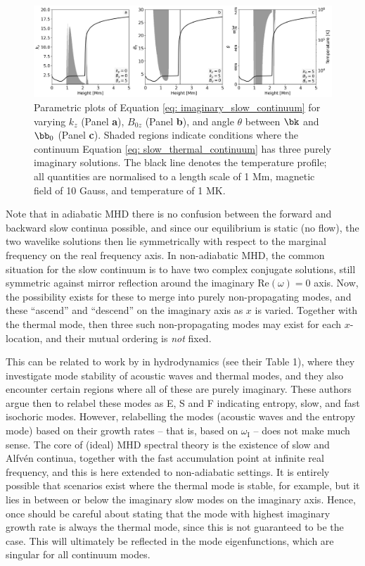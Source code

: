 \begin{figure}[t]
  \centering
  \includegraphics[width=\textwidth]{imaginarysolutions.png}
  \caption{
    Parametric plots of Equation \eqref{eq: imaginary_slow_continuum} for varying $k_z$ (Panel \textbf{a}),
    $B_{0z}$ (Panel \textbf{b}), and angle $\theta$ between $\bk$ and $\bb_0$ (Panel \textbf{c}). Shaded regions indicate conditions where the continuum Equation \eqref{eq: slow_thermal_continuum} has three purely imaginary solutions. The black line denotes the temperature profile; all quantities are normalised to a length scale of 1 Mm, magnetic field of 10 Gauss, and temperature of 1 MK.
  }
  \label{fig: parametric_imaginary}
\end{figure}

Note that in adiabatic MHD there is no confusion between the forward and backward slow continua possible, and since our equilibrium is static (no flow), the two wavelike solutions then lie symmetrically with respect to the marginal frequency on the real frequency axis. In non-adiabatic MHD, the common situation for the slow continuum is to have two complex conjugate solutions, still symmetric against mirror reflection around the imaginary Re$(\omega) = 0$ axis. Now, the possibility exists for these to merge into purely non-propagating modes, and these ``ascend'' and ``descend'' on the imaginary axis as $x$ is varied. Together with the thermal mode, then three such non-propagating modes may exist for each $x$-location, and their mutual ordering is \emph{not} fixed.

This can be related to work by \citet{waters2019} in hydrodynamics (see their Table 1), where they investigate mode stability of acoustic waves and thermal modes, and they also encounter certain regions where all of these are purely imaginary. These authors argue then to relabel these modes as E, S and F indicating entropy, slow, and fast isochoric modes. However, relabelling the modes (acoustic waves and the entropy mode) based on their growth rates -- that is, based on $\omega_\text{I}$ -- does not make much sense. The core of (ideal) MHD spectral theory is the existence of slow and Alfv\'en continua, together with the fast accumulation point at infinite real frequency, and this is here extended to non-adiabatic settings. It is entirely possible that scenarios exist where the thermal mode is stable, for example, but it lies in between or below the imaginary slow modes on the imaginary axis. Hence, once should be careful about stating that the mode with highest imaginary growth rate is always the thermal mode, since this is not guaranteed to be the case. This will ultimately be reflected in the mode eigenfunctions, which are singular for all continuum modes.

